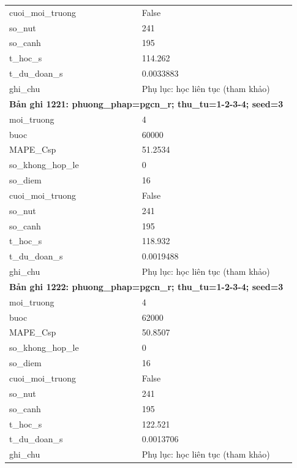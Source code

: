\begin{longtable}{p{0.43\linewidth}p{0.50\linewidth}}
cuoi\_\allowbreak moi\_\allowbreak truong & False \\
so\_\allowbreak nut & 241 \\
so\_\allowbreak canh & 195 \\
t\_\allowbreak hoc\_\allowbreak s & 114.262 \\
t\_\allowbreak du\_\allowbreak doan\_\allowbreak s & 0.0033883 \\
ghi\_\allowbreak chu & Phụ lục: học liên tục (tham khảo) \\
\midrule
\multicolumn{2}{p{0.95\linewidth}}{\textbf{Bản ghi 1221: phuong\_phap=pgcn\_r; thu\_tu=1-2-3-4; seed=3}} \\
moi\_\allowbreak truong & 4 \\
buoc & 60000 \\
MAPE\_\allowbreak Csp & 51.2534 \\
so\_\allowbreak khong\_\allowbreak hop\_\allowbreak le & 0 \\
so\_\allowbreak diem & 16 \\
cuoi\_\allowbreak moi\_\allowbreak truong & False \\
so\_\allowbreak nut & 241 \\
so\_\allowbreak canh & 195 \\
t\_\allowbreak hoc\_\allowbreak s & 118.932 \\
t\_\allowbreak du\_\allowbreak doan\_\allowbreak s & 0.0019488 \\
ghi\_\allowbreak chu & Phụ lục: học liên tục (tham khảo) \\
\midrule
\multicolumn{2}{p{0.95\linewidth}}{\textbf{Bản ghi 1222: phuong\_phap=pgcn\_r; thu\_tu=1-2-3-4; seed=3}} \\
moi\_\allowbreak truong & 4 \\
buoc & 62000 \\
MAPE\_\allowbreak Csp & 50.8507 \\
so\_\allowbreak khong\_\allowbreak hop\_\allowbreak le & 0 \\
so\_\allowbreak diem & 16 \\
cuoi\_\allowbreak moi\_\allowbreak truong & False \\
so\_\allowbreak nut & 241 \\
so\_\allowbreak canh & 195 \\
t\_\allowbreak hoc\_\allowbreak s & 122.521 \\
t\_\allowbreak du\_\allowbreak doan\_\allowbreak s & 0.0013706 \\
ghi\_\allowbreak chu & Phụ lục: học liên tục (tham khảo) \\

\end{longtable}
